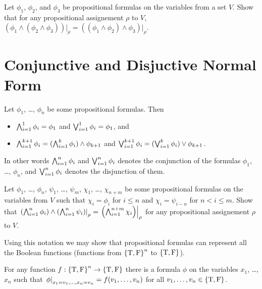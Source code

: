 \begin{exercise}
  Let $\phi_1$, $\phi_2$, and $\phi_3$ be propositional formulas on the
  variables from a set $V$. Show that for any propositional assignement
  $\rho$ to $V$,
  $(\phi_1 \land (\phi_2 \land \phi_3))\big\rvert_\rho =
   ((\phi_1 \land \phi_2) \land \phi_3)\big\rvert_\rho$.
\end{exercise}

\section{Conjunctive and Disjuctive Normal Form}

Let $\phi_1$, \dots, $\phi_n$ be some propositional formulas. Then
\begin{itemize}
  \item $\bigwedge_{i = 1}^1 \phi_i = \phi_1$ and
    $\bigvee_{i = 1}^1 \phi_i = \phi_1$, and
  \item $\bigwedge_{i = 1}^{k + 1} \phi_i =
    (\bigwedge_{i = 1}^{k} \phi_i) \land \phi_{k + 1}$ and
    $\bigvee_{i = 1}^{k + 1} \phi_i =
      (\bigvee_{i = 1}^{k} \phi_i) \lor \phi_{k + 1}$.
\end{itemize}
In other words $\bigwedge_{i = 1}^n \phi_i$ and $\bigvee_{i = 1}^n \phi_i$
denotes the conjunction of the formulas $\phi_1$, \dots, $\phi_n$, and
$\bigvee_{i = 1}^n \phi_i$ denotes the disjunction of them.

\begin{exercise}
  Let $\phi_1$, \dots, $\phi_n$, $\psi_1$, \dots, $\psi_m$, $\chi_1$, \dots,
  $\chi_{n + m}$ be some propositional formulas on the variables from $V$
  such that $\chi_i = \phi_i$ for $i \le n$ and $\chi_i = \psi_{i - n}$ for
  $n < i \le m$. Show that
  $\left. {\left(\bigwedge_{i = 1}^n \phi_i\right) \land
    \left(\bigwedge_{i = 1}^n \psi_i\right)} \right\rvert_{\rho} =
  \left. {\left(\bigwedge_{i = 1}^{n + m} \chi_i\right)} \right\rvert_{\rho}$
  for any propositional assignement $\rho$ to $V$.
\end{exercise}


Using this notation we may show that propositional formulas can represent all
the Boolean functions (functions from $\set{\ltrue, \lfalse}^n$ to
$\set{\ltrue, \lfalse}$).
\begin{theorem}
\label{theorem:function-to-formula}
  For any function $f : \set{\ltrue, \lfalse}^n \to
  \set{\ltrue, \lfalse}$ there is a
  formula $\phi$ on the variables $x_1$, \dots, $x_n$ such that
  $\left. {\phi} \right\rvert_{x_1 = v_1, \dots, x_n = v_n} = f(v_1, \dots, v_n)$ for all
  $v_1, \dots, v_n \in \set{\ltrue, \lfalse}$.
\end{theorem}


